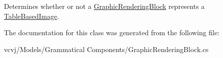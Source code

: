 Determines whether or not a \hyperlink{classvcvj_1_1_models_1_1_grammatical___components_1_1_graphic_rendering_block}{Graphic\+Rendering\+Block} represents a \hyperlink{classvcvj_1_1_models_1_1_grammatical___components_1_1_table_based_image}{Table\+Based\+Image}. 



The documentation for this class was generated from the following file\+:\begin{DoxyCompactItemize}
\item 
vcvj/\+Models/\+Grammatical Components/Graphic\+Rendering\+Block.\+cs\end{DoxyCompactItemize}
